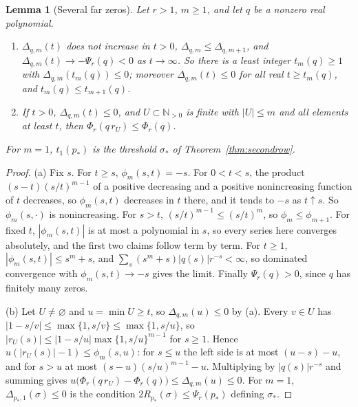\documentclass[11pt]{article}
\newtheorem{lemma}[theorem]{Lemma}
\newcommand{\N}{\mathbb N}
\begin{document}
\begin{lemma}[Several far zeros]\label{lem:farzeros}
Let $r>1$, $m\ge1$, and let $q$ be a nonzero real polynomial.
\begin{enumerate}
\item[(a)] $\Delta_{q,m}(t)$ does not increase in $t>0$,
$\Delta_{q,m}\le\Delta_{q,m+1}$, and $\Delta_{q,m}(t)\to-\Psi_r(q)<0$ as
$t\to\infty$.  So there is a least integer $t_m(q)\ge1$ with
$\Delta_{q,m}(t_m(q))\le0$; moreover $\Delta_{q,m}(t)\le0$ for all real
$t\ge t_m(q)$, and $t_m(q)\le t_{m+1}(q)$.
\item[(b)] If $t>0$, $\Delta_{q,m}(t)\le0$, and $U\subset\N_{>0}$ is finite
with $|U|\le m$ and all elements at least $t$, then
$\Phi_r(q\,r_U)\le\Phi_r(q)$.
\end{enumerate}
For $m=1$, $t_1(p_*)$ is the threshold $\sigma_*$ of
Theorem~\ref{thm:secondrow}.
\end{lemma}

\begin{proof}
(a) Fix $s$.  For $t\ge s$, $\phi_m(s,t)=-s$.  For $0<t<s$, the product
$(s-t)(s/t)^{m-1}$ of a positive decreasing and a positive nonincreasing
function of $t$ decreases, so $\phi_m(s,t)$ decreases in $t$ there, and it
tends to $-s$ as $t\uparrow s$.  So $\phi_m(s,\cdot)$ is nonincreasing.  For
$s>t$, $(s/t)^{m-1}\le(s/t)^m$, so $\phi_m\le\phi_{m+1}$.  For fixed $t$,
$|\phi_m(s,t)|$ is at most a polynomial in $s$, so every series here
converges absolutely, and the first two claims follow term by term.  For
$t\ge1$, $|\phi_m(s,t)|\le s^m+s$, and $\sum_s(s^m+s)|q(s)|r^{-s}<\infty$, so
dominated convergence with $\phi_m(s,t)\to-s$ gives the limit.  Finally
$\Psi_r(q)>0$, since $q$ has finitely many zeros.

(b) Let $U\ne\varnothing$ and $u=\min U\ge t$, so $\Delta_{q,m}(u)\le0$ by
(a).  Every $v\in U$ has $|1-s/v|\le\max\{1,s/v\}\le\max\{1,s/u\}$, so
$|r_U(s)|\le|1-s/u|\max\{1,s/u\}^{m-1}$ for $s\ge1$.  Hence
$u(|r_U(s)|-1)\le\phi_m(s,u)$: for $s\le u$ the left side is at most
$(u-s)-u$, and for $s>u$ at most $(s-u)(s/u)^{m-1}-u$.  Multiplying by
$|q(s)|r^{-s}$ and summing gives
$u\bigl(\Phi_r(q\,r_U)-\Phi_r(q)\bigr)\le\Delta_{q,m}(u)\le0$.  For $m=1$,
$\Delta_{p_*,1}(\sigma)\le0$ is the condition $2R_{p_*}(\sigma)\le\Psi_r(p_*)$
defining $\sigma_*$.
\end{proof}
\end{document}
